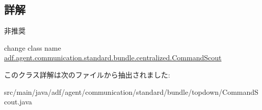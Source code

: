 \subsection{詳解}
\begin{DoxyRefDesc}{非推奨}
\item[\hyperlink{deprecated__deprecated000004}{非推奨}]change class name \hyperlink{classadf_1_1agent_1_1communication_1_1standard_1_1bundle_1_1centralized_1_1CommandScout}{adf.\+agent.\+communication.\+standard.\+bundle.\+centralized.\+Command\+Scout} \end{DoxyRefDesc}


このクラス詳解は次のファイルから抽出されました\+:\begin{DoxyCompactItemize}
\item 
src/main/java/adf/agent/communication/standard/bundle/topdown/Command\+Scout.\+java\end{DoxyCompactItemize}
